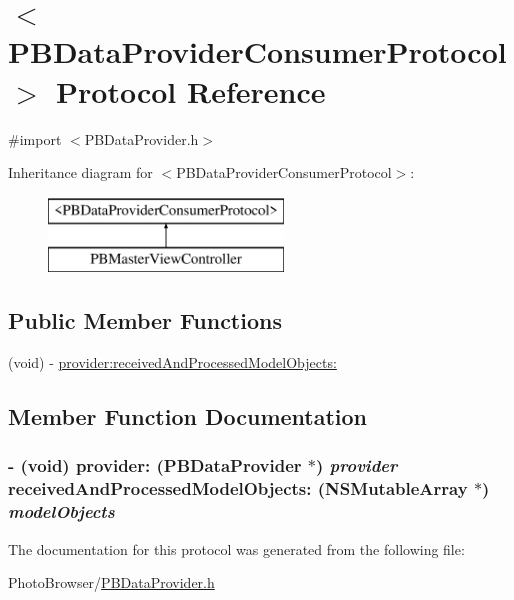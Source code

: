 \hypertarget{protocol_p_b_data_provider_consumer_protocol-p}{
\section{$<$PBDataProviderConsumerProtocol$>$ Protocol Reference}
\label{protocol_p_b_data_provider_consumer_protocol-p}
}


{\ttfamily \#import $<$PBDataProvider.h$>$}

Inheritance diagram for $<$PBDataProviderConsumerProtocol$>$:\begin{figure}[H]
\begin{center}
\leavevmode
\includegraphics[height=2cm]{protocol_p_b_data_provider_consumer_protocol-p}
\end{center}
\end{figure}
\subsection*{Public Member Functions}
\begin{DoxyCompactItemize}
\item 
(void) -\/ \hyperlink{protocol_p_b_data_provider_consumer_protocol-p_a1757c8fdc7990a2bcb6f075cf4d84e8d}{provider:receivedAndProcessedModelObjects:}
\end{DoxyCompactItemize}


\subsection{Member Function Documentation}
\hypertarget{protocol_p_b_data_provider_consumer_protocol-p_a1757c8fdc7990a2bcb6f075cf4d84e8d}{
\subsubsection[{provider:receivedAndProcessedModelObjects:}]{\setlength{\rightskip}{0pt plus 5cm}-\/ (void) provider: ({\bf PBDataProvider} $\ast$) {\em provider}\/ receivedAndProcessedModelObjects: (NSMutableArray $\ast$) {\em modelObjects}}}
\label{protocol_p_b_data_provider_consumer_protocol-p_a1757c8fdc7990a2bcb6f075cf4d84e8d}


The documentation for this protocol was generated from the following file:\begin{DoxyCompactItemize}
\item 
PhotoBrowser/\hyperlink{_p_b_data_provider_8h}{PBDataProvider.h}\end{DoxyCompactItemize}
